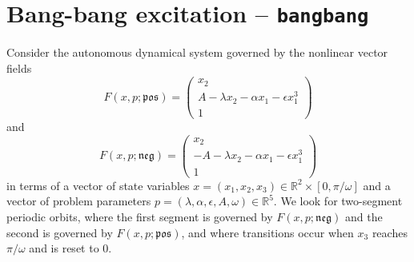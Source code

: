 \section{Bang-bang excitation -- \texttt{bangbang}}
Consider the autonomous dynamical system governed by the nonlinear vector fields
\begin{equation}
F(x,p;\mathfrak{pos})=\left(\begin{array}{c} x_2\\A-\lambda x_2-\alpha x_1-\epsilon x_1^3\\1\end{array}\right)
\end{equation}
and
\begin{equation}
F(x,p;\mathfrak{neg})=\left(\begin{array}{c} x_2\\-A-\lambda x_2-\alpha x_1-\epsilon x_1^3\\1\end{array}\right)
\end{equation}
in terms of a vector of state variables $x=(x_1,x_2,x_3)\in\mathbb{R}^2\times[0,\pi/\omega]$ and a vector of problem parameters $p=(\lambda,\alpha,\epsilon,A,\omega)\in\mathbb{R}^5$. We look for two-segment periodic orbits, where the first segment is governed by $F(x,p;\mathfrak{neg})$ and the second is governed by $F(x,p;\mathfrak{pos})$, and where transitions occur when $x_3$ reaches $\pi/\omega$ and is reset to $0$.

